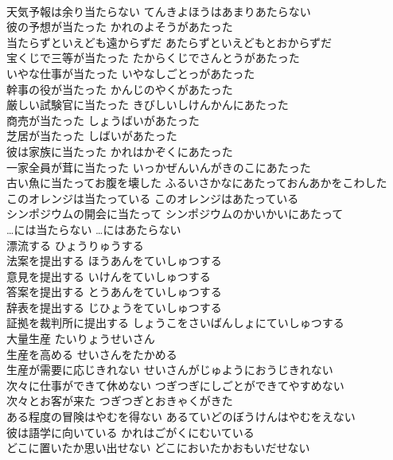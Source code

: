 \documentclass[8pt]{extreport}
\begin{document}
\begin{CJK}{UTF8}{min}
\\	天気予報は余り当たらない	てんきよほうはあまりあたらない	
\\	彼の予想が当たった	かれのよそうがあたった	
\\	当たらずといえども遠からずだ	あたらずといえどもとおからずだ	
\\	宝くじで三等が当たった	たからくじでさんとうがあたった	
\\	いやな仕事が当たった	いやなしごとっがあたった	
\\	幹事の役が当たった	かんじのやくがあたった	
\\	厳しい試験官に当たった	きびしいしけんかんにあたった	
\\	商売が当たった	しょうばいがあたった	
\\	芝居が当たった	しばいがあたった	
\\	彼は家族に当たった	かれはかぞくにあたった	
\\	一家全員が茸に当たった	いっかぜんいんがきのこにあたった	
\\	古い魚に当たってお腹を壊した	ふるいさかなにあたっておんあかをこわした	
\\	このオレンジは当たっている	このオレンジはあたっている	
\\	シンポジウムの開会に当たって	シンポジウムのかいかいにあたって	
\\	…には当たらない	…にはあたらない	
\\	漂流する	ひょうりゅうする	
\\	法案を提出する	ほうあんをていしゅつする	
\\	意見を提出する	いけんをていしゅつする	
\\	答案を提出する	とうあんをていしゅつする	
\\	辞表を提出する	じひょうをていしゅつする	
\\	証拠を裁判所に提出する	しょうこをさいばんしょにていしゅつする	
\\	大量生産	たいりょうせいさん	
\\	生産を高める	せいさんをたかめる	
\\	生産が需要に応じきれない	せいさんがじゅようにおうじきれない	
\\	次々に仕事ができて休めない	つぎつぎにしごとができてやすめない	
\\	次々とお客が来た	つぎつぎとおきゃくがきた	
\\	ある程度の冒険はやむを得ない	あるていどのぼうけんはやむをえない	
\\	彼は語学に向いている	かれはごがくにむいている	
\\	どこに置いたか思い出せない	どこにおいたかおもいだせない	

\end{CJK}
\end{document}
